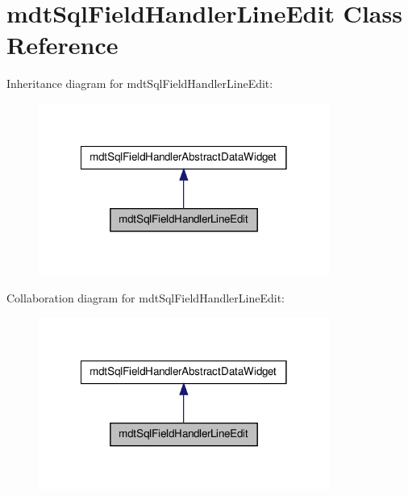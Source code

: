 \hypertarget{classmdt_sql_field_handler_line_edit}{
\section{mdtSqlFieldHandlerLineEdit Class Reference}
\label{classmdt_sql_field_handler_line_edit}
}


Inheritance diagram for mdtSqlFieldHandlerLineEdit:
\nopagebreak
\begin{figure}[H]
\begin{center}
\leavevmode
\includegraphics[width=270pt]{classmdt_sql_field_handler_line_edit__inherit__graph}
\end{center}
\end{figure}


Collaboration diagram for mdtSqlFieldHandlerLineEdit:
\nopagebreak
\begin{figure}[H]
\begin{center}
\leavevmode
\includegraphics[width=270pt]{classmdt_sql_field_handler_line_edit__coll__graph}
\end{center}
\end{figure}
